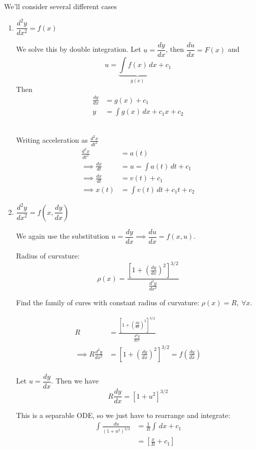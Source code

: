 \documentclass[10pt]{scrartcl}
\begin{document}
We'll consider several different cases
\begin{enumerate}[(1)]
\item $\dfrac{d^2y}{dx^2} = f(x)$

We solve this by double integration. Let $u = \dfrac{dy}{dx}$, then $\dfrac{du}{dx} = F(x)$ and
\[u = \underbrace{\int f(x)\,dx}_{g(x)} + c_1\]
Then 
\[\begin{aligned}\frac{dy}{dx} &= g(x) + c_1\\
y &= \int g(x)\,dx + c_1x + c_2	
\end{aligned}
\]~

\begin{example}[Mechanics] Writing acceleration as $\frac{d^2x}{dt^2}$
	\[
\begin{aligned}
  \frac{d^2x}{dt^2} &= a(t)\\[.2cm]
\implies   \frac{dx}{dt} &= u = \int a(t)\,dt + c_1\\[.2cm]
\implies  \frac{dx}{dt} &= v(t) + c_1\\[.2cm]
\implies   x(t) &= \int v(t)\,dt + c_1t + c_2
\end{aligned}
\]
\end{example}

\item $\dfrac{d^2y}{dx^2} = f\left(x,\dfrac{dy}{dx}\right)$

We again use the substitution $u = \dfrac{dy}{dx} \implies \dfrac{du}{dx} = f(x,u).$\\[.2cm]

\begin{example}[Geometry]
Radius of curvature: 
\[\rho(x) = \frac{\left[1 + \left(\frac{dy}{dx}\right)^2\right]^{3/2}}{\frac{d^2y}{dx^2}}\]

Find the family of cures with constant radius of curvature: $\rho(x) = R,~\forall x$. 

\[
\begin{aligned}
  R &= \frac{\left[1 + \left(\frac{dy}{dx}\right)^2\right]^{3/2}}{\frac{d^2y}{dx^2}}\\[.3cm]
\implies   R\frac{d^2y}{dx^2} &= \left[1 + \left(\frac{dy}{dx}\right)^2\right]^{3/2} = f\left(\frac{dy}{dx}\right)\\
\end{aligned}
\]

Let $u = \dfrac{dy}{dx}$. Then we have
\[R\frac{dy}{dx} = [1 + u^2]^{3/2}\]

This is a separable ODE, so we just have to rearrange and integrate: 
\begin{align*}
	\int \frac{du}{(1+u^2)^{3/2}} &= \frac{1}{R}\int \,dx + c_1\\[.2cm]
	&= \left[\frac{x}{R} + c_1\right]
\end{align*}


\end{example}
\end{enumerate}
\end{document}
